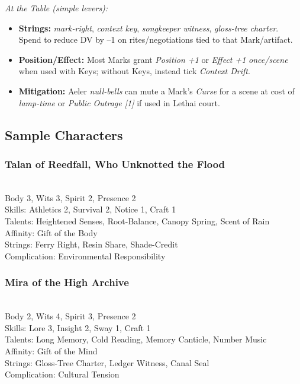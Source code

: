 \documentclass[11pt]{book}
\begin{document}
\textit{At the Table (simple levers):} \\
\begin{itemize}
    \item \textbf{Strings:} \emph{mark-right}, \emph{context key}, \emph{songkeeper witness}, \emph{gloss-tree charter}. Spend to reduce DV by --1 on rites/negotiations tied to that Mark/artifact.
    \item \textbf{Position/Effect:} Most Marks grant \emph{Position +1} or \emph{Effect +1} \emph{once/scene} when used with Keys; without Keys, instead tick \emph{Context Drift}.
    \item \textbf{Mitigation:} Aeler \emph{null-bells} can mute a Mark's \textit{Curse} for a scene at cost of \emph{lamp-time} or \emph{Public Outrage [1]} if used in Lethai court.
\end{itemize}

\subsection{Sample Characters}
\subsubsection*{Talan of Reedfall, Who Unknotted the Flood} \\
Body 3, Wits 3, Spirit 2, Presence 2 \\
Skills: Athletics 2, Survival 2, Notice 1, Craft 1 \\
Talents: Heightened Senses, Root-Balance, Canopy Spring, Scent of Rain \\
Affinity: Gift of the Body \\
Strings: Ferry Right, Resin Share, Shade-Credit \\
Complication: Environmental Responsibility

\subsubsection*{Mira of the High Archive} \\
Body 2, Wits 4, Spirit 3, Presence 2 \\
Skills: Lore 3, Insight 2, Sway 1, Craft 1 \\
Talents: Long Memory, Cold Reading, Memory Canticle, Number Music \\
Affinity: Gift of the Mind \\
Strings: Gloss-Tree Charter, Ledger Witness, Canal Seal \\
Complication: Cultural Tension
\end{document}
